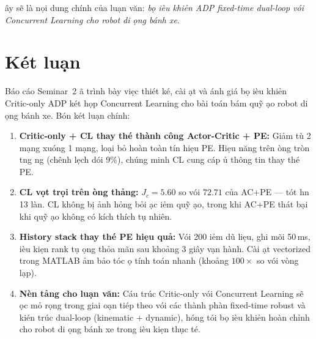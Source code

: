 \documentclass[12pt,a4paper]{article}
\begin{document}
\DJ\^{a}y s\~{e} l\`{a} n\d{o}i dung ch\'{i}nh c\h{u}a lu\d{a}n v\u{a}n: \textit{b\d{o} \dj i\`{e}u khi\h{e}n ADP fixed-time dual-loop v\'{o}i Concurrent Learning cho robot di \dj\d{o}ng b\'{a}nh xe}.

\section{K\'{e}t lu\d{a}n}

B\'{a}o c\'{a}o Seminar~2 \dj\~{a} tr\`{i}nh b\`{a}y vi\d{e}c thi\'{e}t k\'{e}, c\`{a}i \dj\d{a}t v\`{a} \dj\'{a}nh gi\'{a} b\d{o} \dj i\`{e}u khi\h{e}n Critic-only ADP k\'{e}t h\d{o}p Concurrent Learning cho b\`{a}i to\'{a}n b\'{a}m qu\~{y} \dj\d{a}o robot di \dj\d{o}ng b\'{a}nh xe. B\'{o}n k\'{e}t lu\d{a}n ch\'{i}nh:

\begin{enumerate}
    \item \textbf{Critic-only + CL thay th\'{e} th\`{a}nh c\^{o}ng Actor-Critic + PE:} Gi\h{a}m t\`{u} 2 m\d{a}ng xu\'{o}ng 1 m\d{a}ng, lo\d{a}i b\h{o} ho\`{a}n to\`{a}n t\'{i}n hi\d{e}u PE. Hi\d{e}u n\u{a}ng tr\^{e}n \dj\uhorn{}\`{o}ng tr\`{o}n t\uhorn{}\ohorn{}ng \dj\uhorn{}\ohorn{}ng (ch\^{e}nh l\d{e}ch d\uhorn{}\'{o}i 9\%), ch\'{u}ng minh CL cung c\'{a}p \dj\h{u} th\^{o}ng tin thay th\'{e} PE.

    \item \textbf{CL v\uhorn{}\d{o}t tr\d{o}i tr\^{e}n \dj\uhorn{}\`{o}ng th\h{a}ng:} $J_c = 5.60$ so v\'{o}i $72.71$ c\h{u}a AC+PE --- t\'{o}t h\ohorn{}n 13 l\`{a}n. CL kh\^{o}ng b\d{i} \h{a}nh h\uhorn{}\h{o}ng b\h{o}i \dj\d{a}c \dj i\h{e}m qu\~{y} \dj\d{a}o, trong khi AC+PE th\'{a}t b\d{a}i khi qu\~{y} \dj\d{a}o kh\^{o}ng c\'{o} k\'{i}ch th\'{i}ch t\d{u} nhi\^{e}n.

    \item \textbf{History stack thay th\'{e} PE hi\d{e}u qu\h{a}:} V\'{o}i 200 \dj i\h{e}m d\~{u} li\d{e}u, ghi m\~{o}i 50\,ms, \dj i\`{e}u ki\d{e}n rank t\d{u} \dj\d{o}ng th\h{o}a m\~{a}n sau kho\h{a}ng 3 gi\^{a}y v\d{a}n h\`{a}nh. C\`{a}i \dj\d{a}t vectorized trong MATLAB \dj\h{a}m b\h{a}o t\'{o}c \dj\d{o} t\'{i}nh to\'{a}n nhanh (kho\h{a}ng $100\times$ so v\'{o}i v\`{o}ng l\d{a}p).

    \item \textbf{N\`{e}n t\h{a}ng cho lu\d{a}n v\u{a}n:} C\'{a}u tr\'{u}c Critic-only v\'{o}i Concurrent Learning s\~{e} \dj\uhorn{}\d{o}c m\h{o} r\d{o}ng trong giai \dj o\d{a}n ti\'{e}p theo v\'{o}i c\'{a}c th\`{a}nh ph\`{a}n fixed-time robust v\`{a} ki\'{e}n tr\'{u}c dual-loop (kinematic + dynamic), h\uhorn{}\'{o}ng t\'{o}i b\d{o} \dj i\`{e}u khi\h{e}n ho\`{a}n ch\h{i}nh cho robot di \dj\d{o}ng b\'{a}nh xe trong \dj i\`{e}u ki\d{e}n th\d{u}c t\'{e}.
\end{enumerate}
\end{document}
